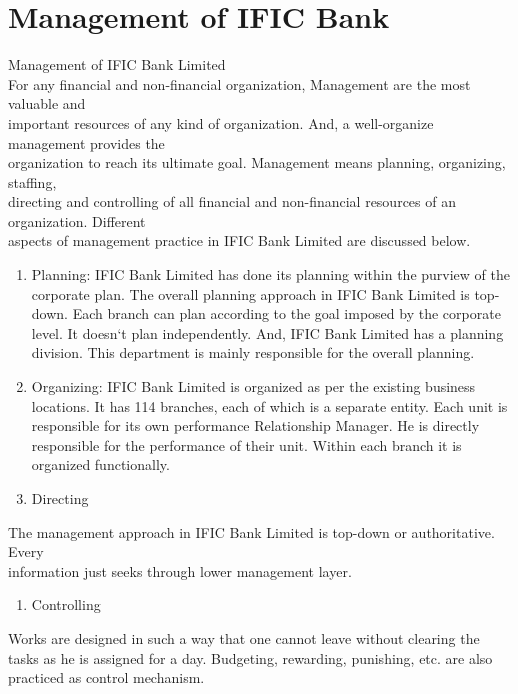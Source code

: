 \documentclass[11pt]{article}
\begin{document}
\section{Management of IFIC Bank}
\label{sec:org54645bd}
Management of IFIC Bank Limited\\
For any financial and non-financial organization, Management are the most valuable and\\
important resources of any kind of organization. And, a well-organize management provides the\\
organization to reach its ultimate goal. Management means planning, organizing, staffing,\\
directing and controlling of all financial and non-financial resources of an organization. Different\\
aspects of management practice in IFIC Bank Limited are discussed below.\\
\begin{enumerate}
\item Planning: IFIC Bank Limited has done its planning within the purview of the corporate plan. The overall planning approach in IFIC Bank Limited is top-down. Each branch can plan according to the goal imposed by the corporate level. It doesn‘t plan independently. And, IFIC Bank Limited has a planning division. This department is mainly responsible for the overall planning.\\
\item Organizing: IFIC Bank Limited is organized as per the existing business locations. It has 114 branches, each of which is a separate entity. Each unit is responsible for its own performance Relationship Manager. He is directly responsible for the performance of their unit. Within each branch it is organized functionally.\\
\item Directing\\
\end{enumerate}
The management approach in IFIC Bank Limited is top-down or authoritative. Every\\
information just seeks through lower management layer.\\
\begin{enumerate}
\item Controlling\\
\end{enumerate}
Works are designed in such a way that one cannot leave without clearing the tasks as he is assigned for a day.  Budgeting, rewarding, punishing, etc. are also practiced as control mechanism.\\
\end{document}
